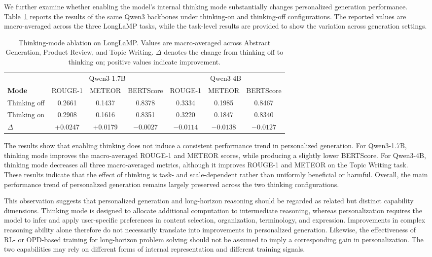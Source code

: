 \documentclass{article} %
\begin{document}
We further examine whether enabling the model's internal thinking mode
substantially changes personalized generation performance. Table~\ref{tab:thinking_ablation}
reports the results of the same Qwen3 backbones under thinking-on and
thinking-off configurations. The reported values are macro-averaged across
the three LongLaMP tasks, while the task-level results are provided to show
the variation across generation settings.

\begin{table}
\centering
\small
\caption{Thinking-mode ablation on LongLaMP. Values are macro-averaged across
Abstract Generation, Product Review, and Topic Writing. $\Delta$ denotes the
change from thinking off to thinking on; positive values indicate improvement.}
\label{tab:thinking_ablation}
\begin{tabular}{lccc|ccc}
\toprule
& \multicolumn{3}{c|}{Qwen3-1.7B}
& \multicolumn{3}{c}{Qwen3-4B} \\
\textbf{Mode}
& ROUGE-1 & METEOR & BERTScore
& ROUGE-1 & METEOR & BERTScore \\
\midrule
Thinking off
& 0.2661 & 0.1437 & 0.8378
& 0.3334 & 0.1985 & 0.8467 \\
Thinking on
& 0.2908 & 0.1616 & 0.8351
& 0.3220 & 0.1847 & 0.8340 \\
$\Delta$
& +0.0247 & +0.0179 & $-0.0027$
& $-0.0114$ & $-0.0138$ & $-0.0127$ \\
\bottomrule
\end{tabular}
\end{table}

The results show that enabling thinking does not induce a consistent
performance trend in personalized generation. For Qwen3-1.7B, thinking mode
improves the macro-averaged ROUGE-1 and METEOR scores, while producing a
slightly lower BERTScore. For Qwen3-4B, thinking mode decreases all three
macro-averaged metrics, although it improves ROUGE-1 and METEOR on the Topic
Writing task. These results indicate that the effect of thinking is
task- and scale-dependent rather than uniformly beneficial or harmful.
Overall, the main performance trend of personalized generation remains
largely preserved across the two thinking configurations.

This observation suggests that personalized generation and long-horizon
reasoning should be regarded as related but distinct capability dimensions.
Thinking mode is designed to allocate additional computation to intermediate
reasoning, whereas personalization requires the model to infer and apply
user-specific preferences in content selection, organization, terminology,
and expression. Improvements in complex reasoning ability alone therefore do
not necessarily translate into improvements in personalized generation.
Likewise, the effectiveness of RL- or OPD-based training for long-horizon
problem solving should not be assumed to imply a corresponding gain in
personalization. The two capabilities may rely on different forms of
internal representation and different training signals.
\end{document}
